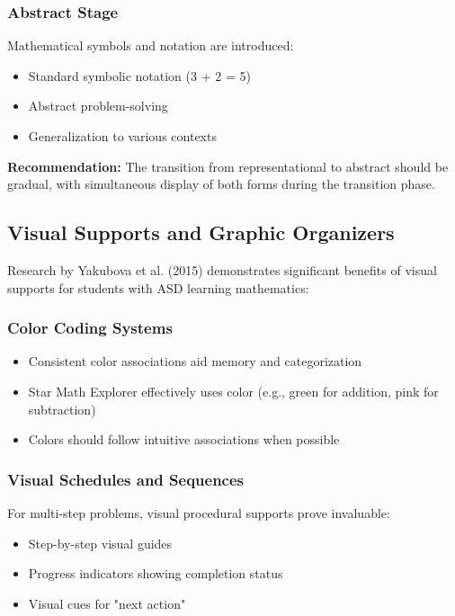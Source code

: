 \documentclass[12pt, a4paper]{article}
\begin{document}
\subsubsection{Abstract Stage}

Mathematical symbols and notation are introduced:

\begin{itemize}[leftmargin=*]
    \item Standard symbolic notation (3 + 2 = 5)
    \item Abstract problem-solving
    \item Generalization to various contexts
\end{itemize}

\textbf{Recommendation:} The transition from representational to abstract should be gradual, with simultaneous display of both forms during the transition phase.

\subsection{Visual Supports and Graphic Organizers}

Research by Yakubova et al. (2015) demonstrates significant benefits of visual supports for students with ASD learning mathematics:

\subsubsection{Color Coding Systems}

\begin{itemize}[leftmargin=*]
    \item Consistent color associations aid memory and categorization
    \item Star Math Explorer effectively uses color (e.g., green for addition, pink for subtraction)
    \item Colors should follow intuitive associations when possible
\end{itemize}

\subsubsection{Visual Schedules and Sequences}

For multi-step problems, visual procedural supports prove invaluable:

\begin{itemize}[leftmargin=*]
    \item Step-by-step visual guides
    \item Progress indicators showing completion status
    \item Visual cues for "next action"
\end{itemize}
\end{document}

